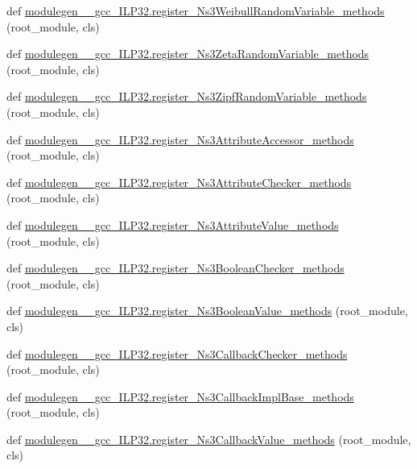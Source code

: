 \begin{DoxyCompactItemize}
\item 
def \hyperlink{namespacemodulegen____gcc__ILP32_a1b7e953b4fcdede15ddee8f372636aeb}{modulegen\+\_\+\+\_\+gcc\+\_\+\+I\+L\+P32.\+register\+\_\+\+Ns3\+Weibull\+Random\+Variable\+\_\+methods} (root\+\_\+module, cls)
\item 
def \hyperlink{namespacemodulegen____gcc__ILP32_aa274e4bd8d5ca034ca1600f4e3837763}{modulegen\+\_\+\+\_\+gcc\+\_\+\+I\+L\+P32.\+register\+\_\+\+Ns3\+Zeta\+Random\+Variable\+\_\+methods} (root\+\_\+module, cls)
\item 
def \hyperlink{namespacemodulegen____gcc__ILP32_ac5e1d46fed6d871a113192dad04bec07}{modulegen\+\_\+\+\_\+gcc\+\_\+\+I\+L\+P32.\+register\+\_\+\+Ns3\+Zipf\+Random\+Variable\+\_\+methods} (root\+\_\+module, cls)
\item 
def \hyperlink{namespacemodulegen____gcc__ILP32_a8f1258b8ab8ec43af174fc3ff9198eb6}{modulegen\+\_\+\+\_\+gcc\+\_\+\+I\+L\+P32.\+register\+\_\+\+Ns3\+Attribute\+Accessor\+\_\+methods} (root\+\_\+module, cls)
\item 
def \hyperlink{namespacemodulegen____gcc__ILP32_a891dd82b08e1260e01670cf52c90138c}{modulegen\+\_\+\+\_\+gcc\+\_\+\+I\+L\+P32.\+register\+\_\+\+Ns3\+Attribute\+Checker\+\_\+methods} (root\+\_\+module, cls)
\item 
def \hyperlink{namespacemodulegen____gcc__ILP32_a7475be8fb4d2d4611c513f6d21c50a32}{modulegen\+\_\+\+\_\+gcc\+\_\+\+I\+L\+P32.\+register\+\_\+\+Ns3\+Attribute\+Value\+\_\+methods} (root\+\_\+module, cls)
\item 
def \hyperlink{namespacemodulegen____gcc__ILP32_ab414168a02828985c68a8c86579fc903}{modulegen\+\_\+\+\_\+gcc\+\_\+\+I\+L\+P32.\+register\+\_\+\+Ns3\+Boolean\+Checker\+\_\+methods} (root\+\_\+module, cls)
\item 
def \hyperlink{namespacemodulegen____gcc__ILP32_a6621c83b18c9ae966428ec3c08728331}{modulegen\+\_\+\+\_\+gcc\+\_\+\+I\+L\+P32.\+register\+\_\+\+Ns3\+Boolean\+Value\+\_\+methods} (root\+\_\+module, cls)
\item 
def \hyperlink{namespacemodulegen____gcc__ILP32_acf2267ead3a407631a6fe495c0560d6b}{modulegen\+\_\+\+\_\+gcc\+\_\+\+I\+L\+P32.\+register\+\_\+\+Ns3\+Callback\+Checker\+\_\+methods} (root\+\_\+module, cls)
\item 
def \hyperlink{namespacemodulegen____gcc__ILP32_a9a85026102c692583453c9b637b8b837}{modulegen\+\_\+\+\_\+gcc\+\_\+\+I\+L\+P32.\+register\+\_\+\+Ns3\+Callback\+Impl\+Base\+\_\+methods} (root\+\_\+module, cls)
\item 
def \hyperlink{namespacemodulegen____gcc__ILP32_a08e2760d3ccd91256fbce9ef63b1e10b}{modulegen\+\_\+\+\_\+gcc\+\_\+\+I\+L\+P32.\+register\+\_\+\+Ns3\+Callback\+Value\+\_\+methods} (root\+\_\+module, cls)

\end{DoxyCompactItemize}
